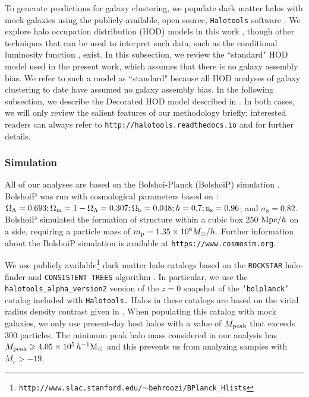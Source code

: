 \documentclass[usenatbib,usegraphicx,letterpaper]{mn2e}
\begin{document}
To generate predictions for galaxy clustering, 
we populate dark matter halos with mock galaxies using the publicly-available, 
open source, {\tt Halotools} software \citep{halotools}.
We explore halo occupation distribution (HOD) models in this work
\citep[e.g.][]{seljak00,ma_fry00,scoccimarro01a,berlind02}, though other
techniques that can be used to interpret such data, such as the conditional luminosity function
\citep[CLF, e.g.,][]{yang03,vdBosch13}, exist. In this subsection, we review the ``standard" HOD
model used in the present work, which assumes that there is no galaxy assembly bias. We refer to
such a model as ``standard" because all HOD analyses of galaxy clustering to date have assumed no
galaxy assembly bias. In the following subsection, we describe
the Decorated HOD model described in \citet{hearin_etal16}. In both cases, we will only
review the salient features of our methodology briefly;
interested readers can always refer to {\tt http://halotools.readthedocs.io} and
\citet{hearin_etal16} for further details.


\subsubsection{Simulation}

All of our analyses are based on the Bolshoi-Planck (BolshoiP) simulation \citep{riebe_etal11}.
BolshoiP was run with cosmological parameters based on \citet{planck13}:
$\Omega_{\Lambda} = 0.693; \Omega_{\rm m} = 1 - \Omega_{\Lambda} = 0.307; \Omega_{\rm b} = 0.048;
h = 0.7; {\rm n_s}=0.96$; and $\sigma_8 = 0.82$. BolshoiP simulated the formation of structure within a cubic 
box $250$ ${\rm Mpc}/h$ on a side, requiring a particle mass of $m_{\rm p} = 1.35\times10^{8}M_{\odot}/h.$
Further information about the BolshoiP simulation is available at {\tt https://www.cosmosim.org}.

We use publicly available\footnote{\tt http://www.slac.stanford.edu/$\sim$behroozi/BPlanck\_Hlists} dark matter
halo catalogs based on the {\tt ROCKSTAR} halo-finder \citep{behroozi_rockstar11} and {\tt CONSISTENT TREES} algorithm \citep{behroozi_trees13}. In particular, we use the {\tt halotools\_alpha\_version2} version of the $z=0$ snapshot
of the {\tt `bolplanck'} catalog included with {\tt Halotools.} Halos in these catalogs are based on the virial radius
density contrast given in \citet{bryan_norman98}. When populating this catalog with mock galaxies, we only use
present-day host halos with a value of $M_{\rm peak}$ that exceeds $300$ particles. The minimum 
peak halo mass considered in our analysis has $M_{\rm peak} \ge 4.05 \times 10^5\, h^{-1}\mathrm{M}_{\odot}$ 
and this prevents us from analyzing samples with $M_r > -19$. 
\end{document}
